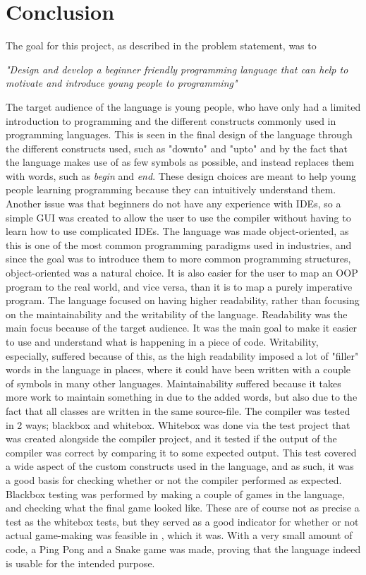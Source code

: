 \section{Conclusion}
The goal for this project, as described in the problem statement, was to 

\textit{"Design and develop a beginner friendly programming language that can help to motivate and introduce young people to programming"}

The target audience of the language is young people, who have only had a limited introduction to programming and the different constructs commonly used in programming languages. This is seen in the final design of the language through the different constructs used, such as "downto" and "upto" and by the fact that the language makes use of as few symbols as possible, and instead replaces them with words, such as \textit{begin} and \textit{end}. These design choices are meant to help young people learning programming because they can intuitively understand them. \newline
Another issue was that beginners do not have any experience with IDEs, so a simple GUI was created to allow the user to use the compiler without having to learn how to use complicated IDEs.\newline
The language was made object-oriented, as this is one of the most common programming paradigms used in industries, and since the goal was to introduce them to more common programming structures, object-oriented was a natural choice. It is also easier for the user to map an OOP program to the real world, and vice versa, than it is to map a purely imperative program.\newline
The language focused on having higher readability, rather than focusing on the maintainability and the writability of the language. Readability was the main focus because of the target audience. It was the main goal to make it easier to use and understand what is happening in a piece of code. Writability, especially, suffered because of this, as the high readability imposed a lot of "filler" words in the language in places, where it could have been written with a couple of symbols in many other languages. Maintainability suffered because it takes more work to maintain something in \lang{} due to the added words, but also due to the fact that all classes are written in the same source-file.\newline
The compiler was tested in 2 ways; blackbox and whitebox. Whitebox was done via the test project that was created alongside the compiler project, and it tested if the output of the compiler was correct by comparing it to some expected output. This test covered a wide aspect of the custom constructs used in the language, and as such, it was a good basis for checking whether or not the compiler performed as expected.
Blackbox testing was performed by making a couple of games in the language, and checking what the final game looked like. These are of course not as precise a test as the whitebox tests, but they served as a good indicator for whether or not actual game-making was feasible in \lang{}, which it was. With a very small amount of code, a Ping Pong and a Snake game was made, proving that the language indeed is usable for the intended purpose. 

